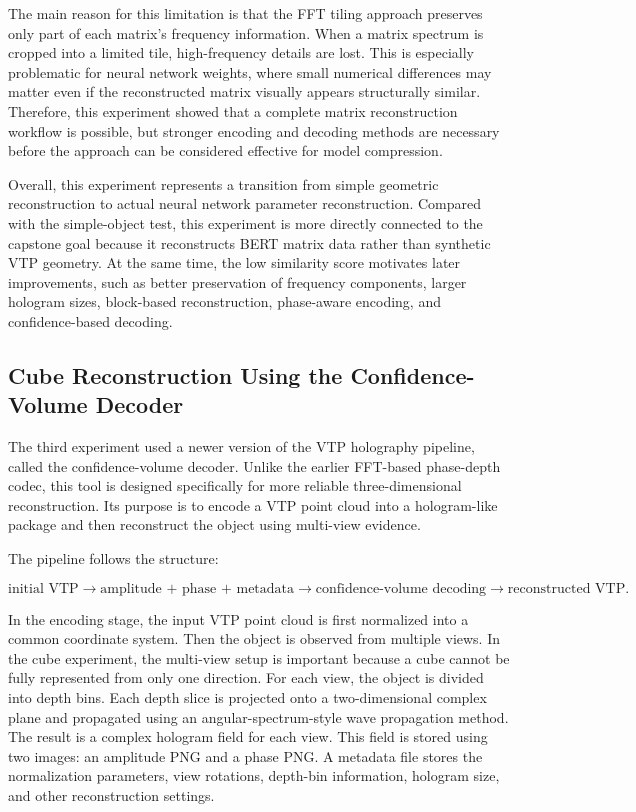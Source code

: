 \documentclass{article}
\begin{document}
\begin{normalsize}
The main reason for this limitation is that the FFT tiling approach preserves only part of each matrix's frequency information. When a matrix spectrum is cropped into a limited tile, high-frequency details are lost. This is especially problematic for neural network weights, where small numerical differences may matter even if the reconstructed matrix visually appears structurally similar. Therefore, this experiment showed that a complete matrix reconstruction workflow is possible, but stronger encoding and decoding methods are necessary before the approach can be considered effective for model compression.

Overall, this experiment represents a transition from simple geometric reconstruction to actual neural network parameter reconstruction. Compared with the simple-object test, this experiment is more directly connected to the capstone goal because it reconstructs BERT matrix data rather than synthetic VTP geometry. At the same time, the low similarity score motivates later improvements, such as better preservation of frequency components, larger hologram sizes, block-based reconstruction, phase-aware encoding, and confidence-based decoding.

\subsection{Cube Reconstruction Using the Confidence-Volume Decoder}

The third experiment used a newer version of the VTP holography pipeline, called the confidence-volume decoder. Unlike the earlier FFT-based phase-depth codec, this tool is designed specifically for more reliable three-dimensional reconstruction. Its purpose is to encode a VTP point cloud into a hologram-like package and then reconstruct the object using multi-view evidence.

The pipeline follows the structure:

\[
\text{initial VTP}
\rightarrow
\text{amplitude + phase + metadata}
\rightarrow
\text{confidence-volume decoding}
\rightarrow
\text{reconstructed VTP}.
\]

In the encoding stage, the input VTP point cloud is first normalized into a common coordinate system. Then the object is observed from multiple views. In the cube experiment, the multi-view setup is important because a cube cannot be fully represented from only one direction. For each view, the object is divided into depth bins. Each depth slice is projected onto a two-dimensional complex plane and propagated using an angular-spectrum-style wave propagation method. The result is a complex hologram field for each view. This field is stored using two images: an amplitude PNG and a phase PNG. A metadata file stores the normalization parameters, view rotations, depth-bin information, hologram size, and other reconstruction settings.


\end{normalsize}
\end{document}
